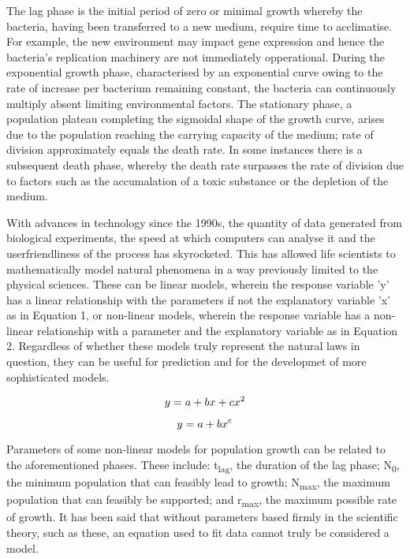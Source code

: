 \documentclass[11pt]{article}
\begin{document}
The lag phase is the initial period of zero or minimal growth whereby the bacteria, having been transferred to a new medium, require time to acclimatise. For example, the new environment may impact gene expression and hence the bacteria's replication machinery are not immediately opperational.\parencite{Buchanan1918} During the exponential growth phase, characterised by an exponential curve owing to the rate of increase per bacterium remaining constant, the bacteria can continuously multiply absent limiting environmental factors.\parencite{Micha2011} The stationary phase, a population plateau completing the sigmoidal shape of the growth curve, arises due to the population reaching the carrying capacity of the medium; rate of division approximately equals the death rate.\parencite{Buchanan1918} In some instances there is a subsequent death phase, whereby the death rate surpasses the rate of division due to factors such as the accumalation of a toxic substance or the depletion of the medium.\parencite{Micha2011} 

With advances in technology since the 1990s, the quantity of data generated from biological experiments, the speed at which computers can analyse it and the userfriendliness of the process has skyrocketed. This has allowed life scientists to mathematically model natural phenomena in a way previously limited to the physical sciences.\parencite{Bolker2013,Johnson2004} These can be linear models, wherein the response variable 'y' has a linear relationship with the parameters if not the explanatory variable 'x' as in Equation 1, or non-linear models, wherein the response variable has a non-linear relationship with a parameter and the explanatory variable as in Equation 2.\parencite{Bolker2013} Regardless of whether these models truly represent the natural laws in question, they can be useful for prediction and for the developmet of more sophisticated models.\parencite{Transtrum2016}

\begin{equation}
    y = a + bx + cx\textsuperscript{2}
\end{equation}

\begin{equation}
    y = a + bx\textsuperscript{c}
\end{equation}
\vspace{2mm}

Parameters of some non-linear models for population growth can be related to the aforementioned phases. These include: t\textsubscript{lag}, the duration of the lag phase; N\textsubscript{0}, the minimum population that can feasibly lead to growth; N\textsubscript{max}, the maximum population that can feasibly be supported; and r\textsubscript{max}, the maximum possible rate of growth.\parencite{Micha2011} It has been said that without parameters based firmly in the scientific theory, such as these, an equation used to fit data cannot truly be considered a model.\parencite{Buchanan1997}
\end{document}
